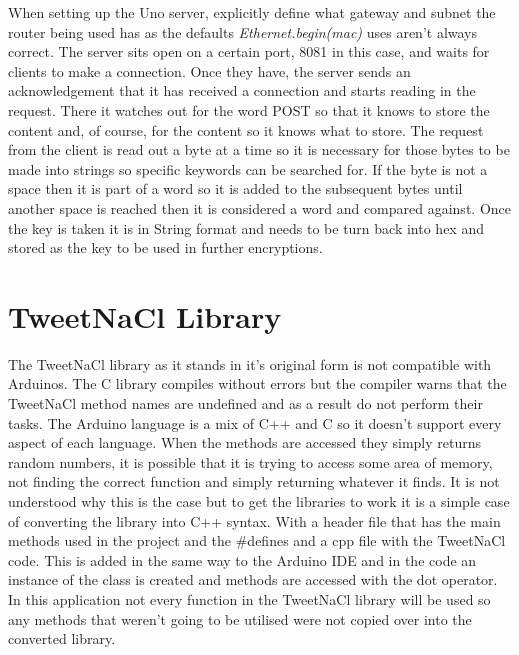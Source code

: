 When setting up the Uno server, explicitly define what gateway and subnet the router being used has as the defaults \emph{Ethernet.begin(mac)} uses aren't always correct. The server sits open on a certain port, 8081 in this case, and waits for clients to make a connection. Once they have, the server sends an acknowledgement that it has received a connection and starts reading in the request. There it watches out for the word POST so that it knows to store the content and, of course, for the content so it knows what to store. The request from the client is read out a byte at a time so it is necessary for those bytes to be made into strings so specific keywords can be searched for. If the byte is not a space then it is part of a word so it is added to the subsequent bytes until another space is reached then it is considered a word and compared against. Once the key is taken it is in String format and needs to be turn back into hex and stored as the key to be used in further encryptions.


\section{TweetNaCl Library}

The TweetNaCl library as it stands in it's original form is not compatible with Arduinos. The C library compiles without errors but the compiler warns that the TweetNaCl method names are undefined and as a result do not perform their tasks. The Arduino language is a mix of C++ and C so it doesn't support every aspect of each language. When the methods are accessed they simply returns random numbers, it is possible that it is trying to access some area of memory, not finding the correct function and simply returning whatever it finds. It is not understood why this is the case but to get the libraries to work it is a simple case of converting the library into C++ syntax. With a header file that has the main methods used in the project and the \#defines and a cpp file with the TweetNaCl code. This is added in the same way to the Arduino IDE and in the code an instance of the class is created and methods are accessed with the dot operator. In this application not every function in the TweetNaCl library will be used so any methods that weren't going to be utilised were not copied over into the converted library.



